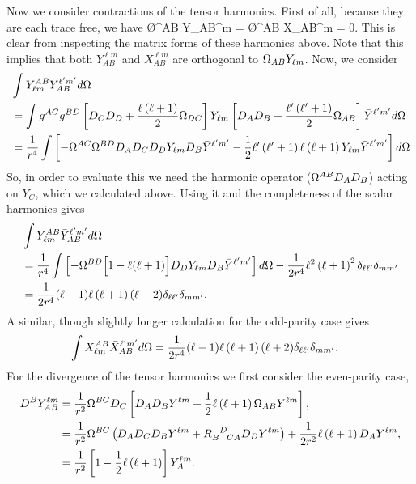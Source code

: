\documentclass{article}
\begin{document}
Now we consider contractions of the tensor harmonics.  First of all,
because they are each trace free, we have
\be
\O^{AB} Y_{AB}^{\ell m} = \O^{AB} X_{AB}^{\ell m} = 0.
\ee
This is clear from inspecting the matrix forms of these harmonics above.
Note that this implies that both $Y_{AB}^{\ell m}$ and $X_{AB}^{\ell m}$ 
are orthogonal to $\Omega_{AB} Y_{\ell m}$.
Now, we consider
\begin{align}
& \int Y^{AB}_{\ell m} \bar Y_{AB}^{\ell'm'}  d \Omega  \nonumber \\
&= \int g^{AC} g^{BD} \left[  D_C D_D 
+ \frac{\ell \left( \ell + 1 \right)}{2}  \Omega_{DC} 
\right] Y_{\ell m}
\left[ D_A D_B + \frac{\ell' \left( \ell' + 1 \right)}{2} \Omega_{AB} \right] \bar Y^{\ell' m'}d \Omega\\ 
&=  \frac{1}{r^{4}}
\int \left[-  \Omega^{AC} \Omega^{BD} D_A D_C D_D Y_{\ell m} D_B \bar Y^{\ell' m'} 
- \frac{1}{2} \ell' \left( \ell' + 1 \right) 
\ell \left( \ell + 1 \right) Y_{\ell m}  \bar Y^{\ell' m'} \right] d \Omega  
\end{align}
So, in order to evaluate this we need the harmonic operator 
($\Omega^{AB} D_{A} D_{B}$) acting on $Y_{C}$, which we calculated above.  Using it
and the completeness of the scalar harmonics gives
\begin{align}
& \int Y^{AB}_{\ell m}  \bar Y_{AB}^{\ell'm'}  d \Omega  \nonumber \\
&=  \frac{1}{r^{4}}\int \left[-\Omega^{BD} \Big[ 1 - \ell (\ell+1) \Big] D_D Y_{\ell m} D_B 
\bar Y^{\ell' m'} \right] d \Omega
- \frac{1}{2 r^{4}} \ell^{2} \left( \ell + 1 \right)^{2} \delta_{\ell \ell'} \delta_{mm'} 
\\
&= \frac{1}{2 r^{4}} (\ell-1) \ell \left( \ell + 1 \right)  (\ell+2) \delta_{\ell \ell'} \delta_{mm'} .
\end{align}
A similar, though slightly longer calculation for the odd-parity case gives
\begin{align}
\int X^{AB}_{\ell m} \bar X_{AB}^{\ell'm'}  d \Omega 
&= \frac{1}{2 r^{4}} (\ell-1) \ell \left( \ell + 1 \right)  (\ell+2) \delta_{\ell \ell'} \delta_{mm'} .
\end{align}
For the divergence of the tensor harmonics we first consider the even-parity
case,
\begin{align}
D^{B} Y^{\ell m}_{AB} 
&= \frac{1}{r^{2}} \Omega^{BC} D_{C}\left[ D_{A} D_{B} Y^{\ell m} 
+ \frac{1}{2} \ell \left( \ell + 1 \right) \Omega_{AB}  Y^{\ell m} \right], \\
&= \frac{1}{r^{2}} \Omega^{BC} \left( D_{A} D_{C}  D_{B} Y^{\ell m} 
+ R_{B \ \ CA}^{\ \ D} D_{D} Y^{\ell m} \right) 
+ \frac{1}{2 r^{2}} \ell \left( \ell + 1 \right) D_{A} Y^{\ell m},\\
&=  \frac{1}{r^{2}} \left[ 1 - \frac{1}{2} \ell \left( \ell + 1 \right)  \right] 
Y_{A}^{\ell m}.
\end{align}
\end{document}
